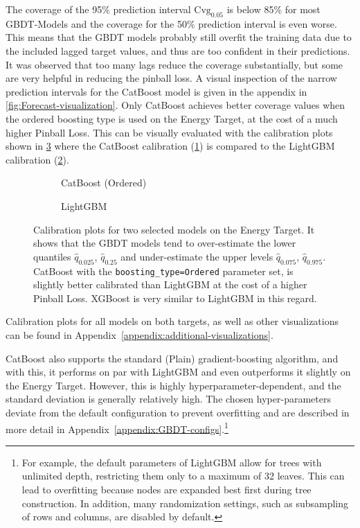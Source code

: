 The coverage of the 95\% prediction interval $\text{Cvg}_{0.05}$ is below 85\% for most GBDT-Models and the coverage for the 50\% prediction interval is even worse. This means that the GBDT models probably still overfit the training data due to the included lagged target values, and thus are too confident in their predictions. It was observed that too many lags reduce the coverage substantially, but some are very helpful in reducing the pinball loss. A visual inspection of the narrow prediction intervals for the CatBoost model is given in the appendix in \cref{fig:Forecast-visualization}.
Only CatBoost achieves better coverage values when the ordered boosting type is used on the Energy
Target, at the cost of a much higher Pinball Loss. This can be visually evaluated with the calibration plots shown in \cref{fig:calibration-comparison} where the CatBoost calibration (\cref{fig:catboost-ordered-calibration}) is compared to the LightGBM calibration (\cref{fig:lgbm-calibration}).
\begin{figure}[htbp]
    \centering
    \begin{subfigure}[b]{0.5\textwidth}
        \centering
        
        \caption{CatBoost (Ordered)}
        \label{fig:catboost-ordered-calibration}
    \end{subfigure}%
    \begin{subfigure}[b]{0.5\textwidth}
        \centering
        
        \caption{LightGBM}
        \label{fig:lgbm-calibration}
    \end{subfigure}
    \caption{Calibration plots for two selected models on the Energy Target. It shows that the GBDT models tend to over-estimate the lower quantiles $\hat{q}_{0.025}$, $\hat{q}_{0.25}$ and under-estimate the upper levels $\hat{q}_{0.075}$, $\hat{q}_{0.975}$. CatBoost with the \texttt{boosting\_type=Ordered} parameter set, is slightly better calibrated than LightGBM at the cost of a higher Pinball Loss. XGBoost is very similar to LightGBM in this regard.}
    \label{fig:calibration-comparison}
\end{figure}

Calibration plots for all models on both targets, as well as other visualizations can be found in Appendix~\ref{appendix:additional-visualizations}.


CatBoost also supports the standard (Plain) gradient-boosting algorithm,
and with this, it performs on par with LightGBM and even outperforms it slightly on
the Energy Target. However, this is highly hyperparameter-dependent, and the standard
deviation is generally relatively high. The chosen hyper-parameters deviate from the default 
configuration to prevent overfitting and are described in more detail in Appendix~\ref{appendix:GBDT-configs}.\footnote{For example, the default parameters of LightGBM allow for trees with unlimited depth, restricting them only to a maximum of 32 leaves. This can lead to overfitting because nodes are expanded best first during tree construction. In addition, many randomization settings, such as subsampling of rows and columns, are disabled by default.}

